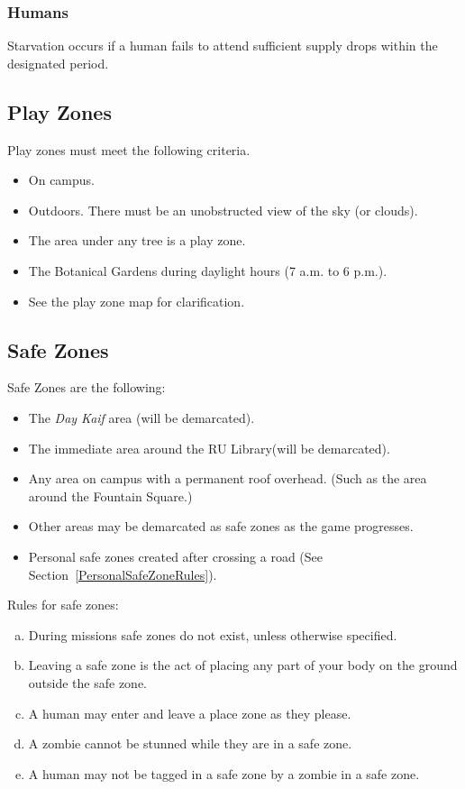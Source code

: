 \documentclass[a4paper,12pt]{article}
\begin{document}
    \subsubsection{Humans}
    Starvation occurs if a human fails to attend sufficient supply drops within the designated period.

\subsection{Play Zones}
Play zones must meet the following criteria.
\begin{itemize}
    \item On campus.
    \item Outdoors. There must be an unobstructed view of the sky (or clouds).
    \item The area under any tree is a play zone. 
    \item The Botanical Gardens during daylight hours (7 a.m. to 6 p.m.).
    \item See the play zone map for clarification.
\end{itemize}

\subsection{Safe Zones}
Safe Zones are the following:
\begin{itemize}
    \item The \emph{Day Kaif} area (will be demarcated).
    \item The immediate area around the RU Library(will be demarcated).
    \item Any area on campus with a permanent roof overhead. (Such as the area around the Fountain Square.)
    \item Other areas may be demarcated as safe zones as the game progresses.
    \item Personal safe zones created after crossing a road (See Section~\ref{PersonalSafeZoneRules}).
\end{itemize}

Rules for safe zones:
\begin{enumerate}[(a)]
    \item During missions safe zones do not exist, unless otherwise specified.
    \item Leaving a safe zone is the act of placing any part of your body on the ground outside the safe zone.
    \item A human may enter and leave a place zone as they please.
    \item A zombie cannot be stunned while they are in a safe zone.
    \item A human may not be tagged in a safe zone by a zombie in a safe zone.
\end{enumerate}
\end{document}
